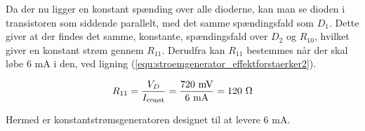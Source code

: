 Da der nu ligger en konstant spænding over alle dioderne, kan man se dioden i transistoren som siddende parallelt, med det samme spændingsfald som $D_1$. Dette giver at der findes det samme, konstante, spændingsfald over $D_2$ og $R_{\mathrm{10}}$, hvilket giver en konstant strøm gennem $R_{\mathrm{11}}$. Derudfra kan $R_{\mathrm{11}}$ bestemmes når der skal løbe 6 mA i den, ved ligning (\ref{equ:stroemgenerator_effektforstaerker2}).

\begin{equation}
\label{equ:stroemgenerator_effektforstaerker2}
R_{\mathrm{11}} = \frac{V_{D}}{I_{\mathrm{const}}} = \mathrm{\frac{720~\mathrm{mV}}{6~\mathrm{mA}} = 120~\ohm}
\end{equation}

Hermed er konstantstrømsgeneratoren designet til at levere 6 mA.

